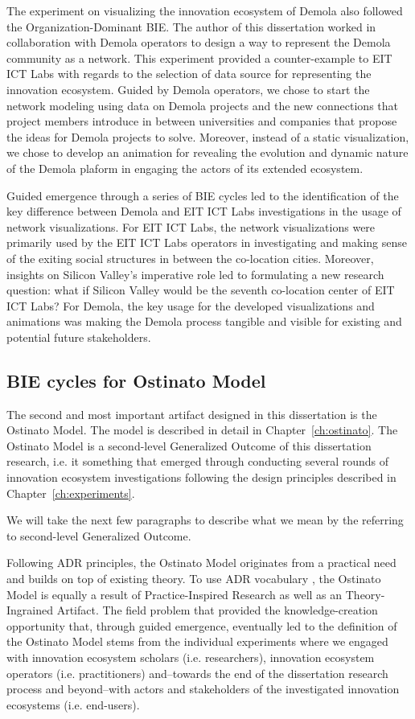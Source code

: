 The experiment on visualizing the innovation ecosystem of Demola also followed the Organization-Dominant BIE. The author of this dissertation worked in collaboration with Demola operators to design a way to represent the Demola community as a network. This experiment provided a counter-example to EIT ICT Labs with regards to the selection of data source for representing the innovation ecosystem. Guided by Demola operators, we chose to start the network modeling using data on Demola projects and the new connections that project members introduce in between universities and companies that propose the ideas for Demola projects to solve. Moreover, instead of a static visualization, we chose to develop an animation for revealing the evolution and dynamic nature of the Demola plaform in engaging the actors of its extended ecosystem. 

Guided emergence through a series of BIE cycles led to the identification of the key difference between Demola and EIT ICT Labs investigations in the usage of network visualizations. For EIT ICT Labs, the network visualizations were primarily used by the EIT ICT Labs operators in investigating and making sense of the exiting social structures in between the co-location cities. Moreover, insights on Silicon Valley's imperative role led to formulating a new research question: what if Silicon Valley would be the seventh co-location center of EIT ICT Labs? For Demola, the key usage for the developed visualizations and animations was making the Demola process tangible and visible for existing and potential future stakeholders.

\subsection{BIE cycles for Ostinato Model}

The second and most important artifact designed in this dissertation is the Ostinato Model. The model is described in detail in Chapter~\ref{ch:ostinato}. The Ostinato Model is a second-level Generalized Outcome \citep[cf.][]{Sein2011ActionResearch} of this dissertation research, i.e. it something that emerged through conducting several rounds of innovation ecosystem investigations following the design principles described in Chapter~\ref{ch:experiments}.

We will take the next few paragraphs to describe what we mean by the referring to second-level Generalized Outcome.

Following ADR principles, the Ostinato Model originates from a practical need and builds on top of existing theory. To use ADR vocabulary \citep{Sein2011ActionResearch}, the Ostinato Model is equally a result of Practice-Inspired Research as well as an Theory-Ingrained Artifact. The field problem that provided the knowledge-creation opportunity that, through guided emergence, eventually led to the definition of the Ostinato Model stems from the individual experiments where we engaged with innovation ecosystem scholars (i.e. researchers), innovation ecosystem operators (i.e. practitioners) and--towards the end  of the dissertation research process and beyond--with actors and stakeholders of the investigated innovation ecosystems (i.e. end-users).

